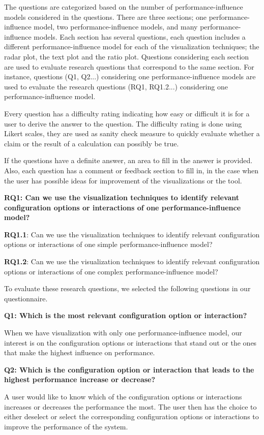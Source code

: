 The questions are categorized based on the number of performance-influence models considered in the questions. There are three sections; one performance-influence model, two performance-influence models, and many performance-influence models. Each section has several questions, each question includes a different performance-influence model for each of the visualization techniques; the radar plot, the text plot and the ratio plot. Questions considering each section are used to evaluate research questions that correspond to the same section. For instance, questions (Q1, Q2...) considering one performance-influence models are used to evaluate the research questions (RQ1, RQ1.2...) considering one performance-influence model.

Every question has a difficulty rating indicating how easy or difficult it is for a user to derive the answer to the question. The difficulty rating is done using Likert scales, they are used as sanity check measure to quickly evaluate whether a claim or the result of a calculation can possibly be true.

If the questions have a definite answer, an area to fill in the answer is provided. Also, each question has a comment or feedback section to fill in, in the case when the user has possible ideas for improvement of the visualizations or the tool.


\textbf{RQ1: Can we use the visualization techniques to identify relevant configuration options or interactions of one performance-influence model?}

\begin{myindentpar}{0.5cm}
\textbf{RQ1.1}: Can we use the visualization techniques to identify relevant configuration options or interactions of one simple performance-influence model?

\textbf{RQ1.2}: Can we use the visualization techniques to identify relevant configuration options or interactions of one complex performance-influence model?

To evaluate these research questions, we selected the following questions in our questionnaire.


\textbf{Q1: Which is the most relevant configuration option or interaction?}

When we have visualization with only one performance-influence model, our interest is on the configuration options or interactions that stand out or the ones that make the highest influence on performance. 

\textbf{Q2: Which is the configuration option or interaction that leads to the highest performance increase or decrease?}

A user would like to know which of the configuration options or interactions increases or decreases the performance the most. The user then has the choice to either deselect or select the corresponding configuration options or interactions to improve the performance of the system.
\end{myindentpar}

